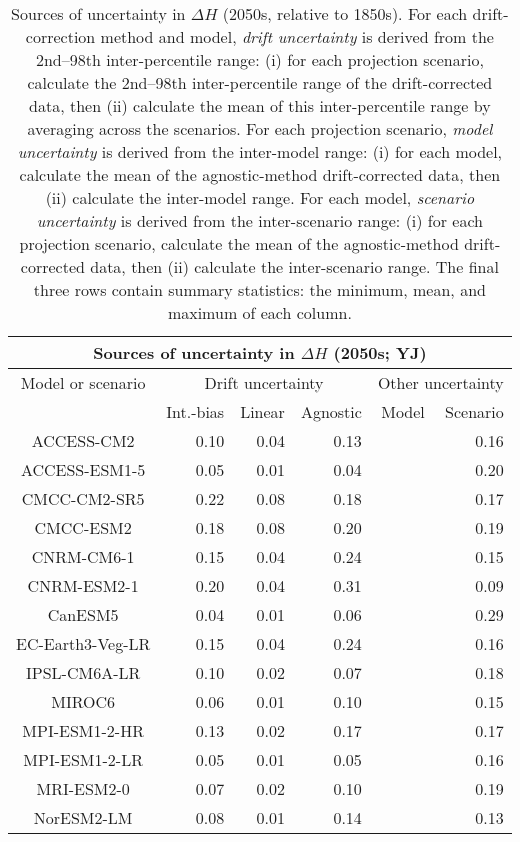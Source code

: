 \begin{table*}[t]
\centering
\caption{Sources of uncertainty in $\Delta H$ (2050s, relative to 1850s). For each drift-correction method and model, \emph{drift uncertainty} is derived from the 2nd--98th inter-percentile range: (i) for each projection scenario, calculate the 2nd--98th inter-percentile range of the drift-corrected data, then (ii) calculate the mean of this inter-percentile range by averaging across the scenarios. For each projection scenario, \emph{model uncertainty} is derived from the inter-model range: (i) for each model, calculate the mean of the agnostic-method drift-corrected data, then (ii) calculate the inter-model range. For each model, \emph{scenario uncertainty} is derived from the inter-scenario range: (i) for each projection scenario, calculate the mean of the agnostic-method drift-corrected data, then (ii) calculate the inter-scenario range. The final three rows contain summary statistics: the minimum, mean, and maximum of each column.}
\begin{tabular}{c|rrr|rr}
\toprule
\multicolumn{6}{c}{Sources of uncertainty in $\Delta H$ (2050s; YJ)} \\ 
\midrule
Model or scenario & \multicolumn{3}{c|}{Drift uncertainty} & \multicolumn{2}{c}{Other uncertainty} \\
 & Int.-bias & Linear & Agnostic & Model & Scenario \\
\midrule
ACCESS-CM2 & 0.10 & 0.04 & 0.13 &  & 0.16 \\
ACCESS-ESM1-5 & 0.05 & 0.01 & 0.04 &  & 0.20 \\
CMCC-CM2-SR5 & 0.22 & 0.08 & 0.18 &  & 0.17 \\
CMCC-ESM2 & 0.18 & 0.08 & 0.20 &  & 0.19 \\
CNRM-CM6-1 & 0.15 & 0.04 & 0.24 &  & 0.15 \\
CNRM-ESM2-1 & 0.20 & 0.04 & 0.31 &  & 0.09 \\
CanESM5 & 0.04 & 0.01 & 0.06 &  & 0.29 \\
EC-Earth3-Veg-LR & 0.15 & 0.04 & 0.24 &  & 0.16 \\
IPSL-CM6A-LR & 0.10 & 0.02 & 0.07 &  & 0.18 \\
MIROC6 & 0.06 & 0.01 & 0.10 &  & 0.15 \\
MPI-ESM1-2-HR & 0.13 & 0.02 & 0.17 &  & 0.17 \\
MPI-ESM1-2-LR & 0.05 & 0.01 & 0.05 &  & 0.16 \\
MRI-ESM2-0 & 0.07 & 0.02 & 0.10 &  & 0.19 \\
NorESM2-LM & 0.08 & 0.01 & 0.14 &  & 0.13 \\

\end{tabular}
\end{table*}
